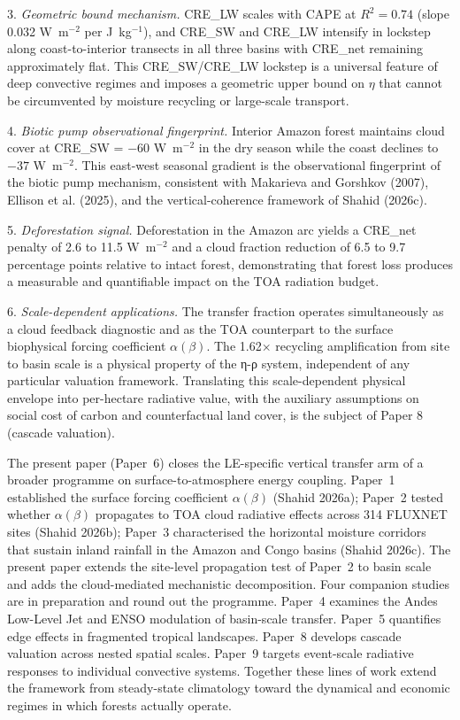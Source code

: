 3. \emph{Geometric bound mechanism.} CRE\_LW scales with CAPE at
$R^2 = 0.74$ (slope 0.032 W~m$^{-2}$ per J~kg$^{-1}$), and CRE\_SW
and CRE\_LW intensify in lockstep along coast-to-interior transects
in all three basins with CRE\_net remaining approximately flat. This
CRE\_SW/CRE\_LW lockstep is a universal feature of deep convective
regimes and imposes a geometric upper bound on $\eta$ that cannot be
circumvented by moisture recycling or large-scale transport.

4. \emph{Biotic pump observational fingerprint.} Interior Amazon
forest maintains cloud cover at CRE\_SW = $-60$ W~m$^{-2}$ in the
dry season while the coast declines to $-37$ W~m$^{-2}$. This
east-west seasonal gradient is the observational fingerprint of the
biotic pump mechanism, consistent with Makarieva and Gorshkov (2007),
Ellison et al. (2025), and the vertical-coherence framework of Shahid
(2026c).

5. \emph{Deforestation signal.} Deforestation in the Amazon arc
yields a CRE\_net penalty of 2.6 to 11.5 W~m$^{-2}$ and a cloud
fraction reduction of 6.5 to 9.7 percentage points relative to
intact forest, demonstrating that forest loss produces a measurable
and quantifiable impact on the TOA radiation budget.

6. \emph{Scale-dependent applications.} The transfer fraction
operates simultaneously as a cloud feedback diagnostic and as
the TOA counterpart to the surface biophysical forcing coefficient
$\alpha(\beta)$. The 1.62$\times$ recycling amplification from site to
basin scale is a physical property of the η-ρ system, independent of
any particular valuation framework. Translating this scale-dependent
physical envelope into per-hectare radiative value, with the auxiliary
assumptions on social cost of carbon and counterfactual land cover,
is the subject of Paper 8 (cascade valuation).

The present paper (Paper~6) closes the LE-specific vertical transfer arm of a broader
programme on surface-to-atmosphere energy coupling. Paper~1
established the surface forcing coefficient $\alpha(\beta)$ (Shahid
2026a); Paper~2 tested whether $\alpha(\beta)$ propagates to TOA
cloud radiative effects across 314 FLUXNET sites (Shahid 2026b);
Paper~3 characterised the horizontal moisture corridors that sustain
inland rainfall in the Amazon and Congo basins (Shahid 2026c). The
present paper extends the site-level propagation test of Paper~2 to
basin scale and adds the cloud-mediated mechanistic decomposition. Four companion studies are in
preparation and round out the programme. Paper~4 examines the
Andes Low-Level Jet and ENSO modulation of basin-scale transfer.
Paper~5 quantifies edge effects in fragmented tropical landscapes.
Paper~8 develops cascade valuation across nested spatial scales.
Paper~9 targets event-scale radiative responses to individual
convective systems. Together these lines of work extend the
framework from steady-state climatology toward the dynamical and
economic regimes in which forests actually operate.

